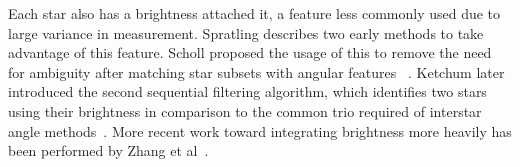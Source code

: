 \documentclass[conference]{IEEEtran}
\begin{document}

    Each star also has a brightness attached it, a feature less commonly used due to large variance in measurement.
    Spratling describes two early methods to take advantage of this feature.
    Scholl proposed the usage of this to remove the need for ambiguity after matching star subsets with angular features
    ~\cite{scholl:starFieldIdentification}.
    Ketchum later introduced the second sequential filtering algorithm, which identifies two stars using their brightness
    in comparison to the common trio required of interstar angle methods~\cite{ketchum:onboardStarIdentification}.
    More recent work toward integrating brightness more heavily has been performed by Zhang et
    al~\cite{zhang:brightnessReferenced}.
\end{document}
